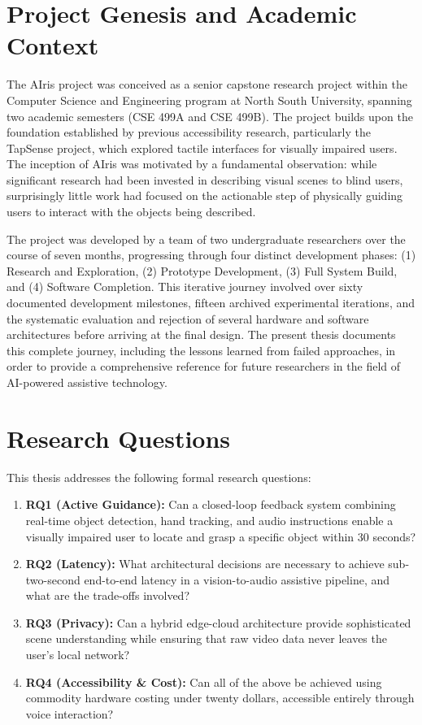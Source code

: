 \documentclass[12pt,a4paper]{report}
\begin{document}
\section{Project Genesis and Academic Context}

The AIris project was conceived as a senior capstone research project within the Computer Science and Engineering program at North South University, spanning two academic semesters (CSE 499A and CSE 499B). The project builds upon the foundation established by previous accessibility research, particularly the TapSense project, which explored tactile interfaces for visually impaired users. The inception of AIris was motivated by a fundamental observation: while significant research had been invested in describing visual scenes to blind users, surprisingly little work had focused on the actionable step of physically guiding users to interact with the objects being described.

The project was developed by a team of two undergraduate researchers over the course of seven months, progressing through four distinct development phases: (1) Research and Exploration, (2) Prototype Development, (3) Full System Build, and (4) Software Completion. This iterative journey involved over sixty documented development milestones, fifteen archived experimental iterations, and the systematic evaluation and rejection of several hardware and software architectures before arriving at the final design. The present thesis documents this complete journey, including the lessons learned from failed approaches, in order to provide a comprehensive reference for future researchers in the field of AI-powered assistive technology.

\section{Research Questions}

This thesis addresses the following formal research questions:

\begin{enumerate}
    \item \textbf{RQ1 (Active Guidance):} Can a closed-loop feedback system combining real-time object detection, hand tracking, and audio instructions enable a visually impaired user to locate and grasp a specific object within 30 seconds?
    \item \textbf{RQ2 (Latency):} What architectural decisions are necessary to achieve sub-two-second end-to-end latency in a vision-to-audio assistive pipeline, and what are the trade-offs involved?
    \item \textbf{RQ3 (Privacy):} Can a hybrid edge-cloud architecture provide sophisticated scene understanding while ensuring that raw video data never leaves the user's local network?
    \item \textbf{RQ4 (Accessibility \& Cost):} Can all of the above be achieved using commodity hardware costing under twenty dollars, accessible entirely through voice interaction?
\end{enumerate}
\end{document}
